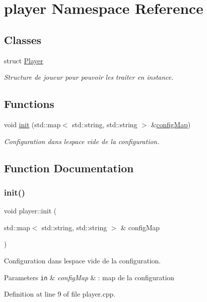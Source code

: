 \hypertarget{namespaceplayer}{}\section{player Namespace Reference}
\label{namespaceplayer}
\subsection*{Classes}
\begin{DoxyCompactItemize}
\item 
struct \hyperlink{structplayer_1_1_player}{Player}
\begin{DoxyCompactList}\small\item\em Structure de joueur pour pouvoir les traiter en instance. \end{DoxyCompactList}\end{DoxyCompactItemize}
\subsection*{Functions}
\begin{DoxyCompactItemize}
\item 
void \hyperlink{namespaceplayer_a580e093d38d3189329f884f8d69b62c9}{init} (std\+::map$<$ std\+::string, std\+::string $>$ \&\hyperlink{main_8cpp_ada2160bcc2082e595d02f0eb5a318dd5}{config\+Map})
\begin{DoxyCompactList}\small\item\em Configuration dans l\textquotesingle{}espace vide de la configuration. \end{DoxyCompactList}\end{DoxyCompactItemize}


\subsection{Function Documentation}
\mbox{\label{namespaceplayer_a580e093d38d3189329f884f8d69b62c9}} 
\subsubsection{\texorpdfstring{init()}{init()}}
{\footnotesize\ttfamily void player\+::init (\begin{DoxyParamCaption}\item[{std\+::map$<$ std\+::string, std\+::string $>$ \&}]{config\+Map }\end{DoxyParamCaption})}



Configuration dans l\textquotesingle{}espace vide de la configuration. 


\begin{DoxyParams}[1]{Parameters}
\mbox{\tt in}  & {\em config\+Map} & \+: map de la configuration \\
\hline
\end{DoxyParams}


Definition at line 9 of file player.\+cpp.

